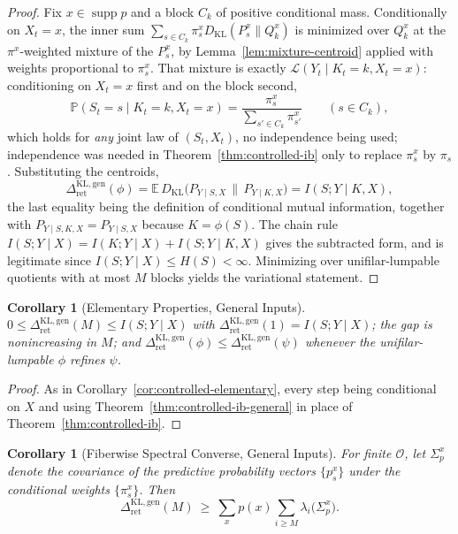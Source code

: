 \documentclass[12pt]{article}
\newtheorem{corollary}[theorem]{Corollary}
\theoremstyle{definition}
\DeclareMathOperator{\supp}{supp}
\newcommand{\RetKLg}{\Delta_{\mathrm{ret}}^{\mathrm{KL,gen}}}
\begin{document}
\begin{proof}
Fix $x\in\supp p$ and a block $C_k$ of positive conditional mass.  Conditionally
on $X_t=x$, the inner sum $\sum_{s\in C_k}\pi_s^xD_{\mathrm{KL}}(P_s^x\|Q_k^x)$
is minimized over $Q_k^x$ at the $\pi^x$-weighted mixture of the $P_s^x$, by
Lemma~\ref{lem:mixture-centroid} applied with weights proportional to
$\pi_s^x$.  That mixture is exactly
$\mathcal L(Y_t\mid K_t=k,X_t=x)$: conditioning on $X_t=x$ first and on the
block second,
\[
\mathbb P(S_t=s\mid K_t=k,X_t=x)
=
\frac{\pi_s^x}{\sum_{s'\in C_k}\pi_{s'}^x}
\qquad(s\in C_k),
\]
which holds for \emph{any} joint law of $(S_t,X_t)$, no independence being
used; independence was needed in Theorem~\ref{thm:controlled-ib} only to
replace $\pi_s^x$ by $\pi_s$.  Substituting the centroids,
\[
\RetKLg(\phi)
=
\mathbb E\,D_{\mathrm{KL}}
\bigl(P_{Y\mid S,X}\,\big\|\,P_{Y\mid K,X}\bigr)
=
I(S;Y\mid K,X),
\]
the last equality being the definition of conditional mutual information,
together with $P_{Y\mid S,K,X}=P_{Y\mid S,X}$ because $K=\phi(S)$.  The chain
rule $I(S;Y\mid X)=I(K;Y\mid X)+I(S;Y\mid K,X)$ gives the subtracted form, and
is legitimate since $I(S;Y\mid X)\le H(S)<\infty$.  Minimizing over
unifilar-lumpable quotients with at most $M$ blocks yields the variational
statement.
\end{proof}

\begin{corollary}[Elementary Properties, General Inputs]
\label{cor:controlled-elementary-general}
$0\le\RetKLg(M)\le I(S;Y\mid X)$ with $\RetKLg(1)=I(S;Y\mid X)$; the gap is
nonincreasing in $M$; and $\RetKLg(\phi)\le\RetKLg(\psi)$ whenever the
unifilar-lumpable $\phi$ refines $\psi$.
\end{corollary}

\begin{proof}
As in Corollary~\ref{cor:controlled-elementary}, every step being conditional
on $X$ and using Theorem~\ref{thm:controlled-ib-general} in place of
Theorem~\ref{thm:controlled-ib}.
\end{proof}

\begin{corollary}[Fiberwise Spectral Converse, General Inputs]
\label{cor:controlled-simplex-general}
For finite $\mathcal O$, let $\Sigma_p^{x}$ denote the covariance of the
predictive probability vectors $\{p_s^x\}$ under the \emph{conditional} weights
$\{\pi_s^x\}$.  Then
\[
\RetKLg(M)
\ \ge\
\sum_xp(x)\sum_{i\ge M}\lambda_i\bigl(\Sigma_p^{x}\bigr).
\]
\end{corollary}
\end{document}
